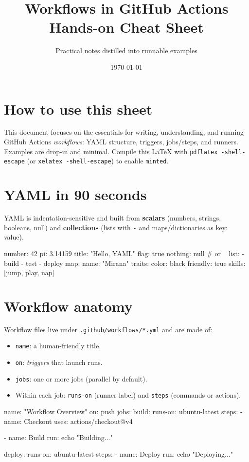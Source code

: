 \documentclass[11pt]{article}
\title{Workflows in GitHub Actions\\\large Hands-on Cheat Sheet}
\author{Practical notes distilled into runnable examples}
\date{\today}
\begin{document}
\maketitle

\section*{How to use this sheet}
This document focuses on the essentials for writing, understanding, and running GitHub Actions \emph{workflows}: YAML structure, triggers, jobs/steps, and runners. Examples are drop-in and minimal. Compile this \LaTeX{} with \verb|pdflatex -shell-escape| (or \verb|xelatex -shell-escape|) to enable \texttt{minted}.

\section{YAML in 90 seconds}
YAML is indentation-sensitive and built from \textbf{scalars} (numbers, strings, booleans, null) and \textbf{collections} (lists with \verb|-| and maps/dictionaries as key: value).

\begin{yamlcode}
number: 42
pi: 3.14159
title: "Hello, YAML"
flag: true
nothing: null   # or ~
list:
  - build
  - test
  - deploy
map:
  name: "Mirana"
  traits:
    color: black
    friendly: true
  skills: [jump, play, nap]
\end{yamlcode}
\clearpage

\section{Workflow anatomy}
Workflow files live under \verb|.github/workflows/*.yml| and are made of:
\begin{itemize}
  \item \texttt{name}: a human-friendly title.
  \item \texttt{on}: \emph{triggers} that launch runs.
  \item \texttt{jobs}: one or more jobs (parallel by default).
  \item Within each job: \texttt{runs-on} (runner label) and \texttt{steps} (commands or actions).
\end{itemize}

\begin{yamlcode}
name: "Workflow Overview"
on: push
jobs:
  build:
    runs-on: ubuntu-latest
    steps:
      - name: Checkout
        uses: actions/checkout@v4

      - name: Build
        run: echo "Building..."

  deploy:
    runs-on: ubuntu-latest
    steps:
      - name: Deploy
        run: echo "Deploying..."
\end{yamlcode}
\end{document}
